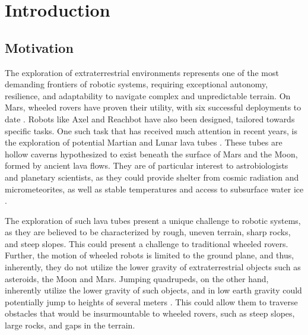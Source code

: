 \section{Introduction}
\label{sec:introduction}

\subsection{Motivation}
\label{sec:motivation}


The exploration of extraterrestrial environments represents one of the most demanding frontiers of robotic systems, requiring exceptional autonomy, resilience, and adaptability to navigate complex and unpredictable terrain. On Mars, wheeled rovers have proven their utility, with six successful deployments to date \cite{mars_rovers_x6}. Robots like Axel \cite{Axel} and Reachbot \cite{ReachBot} have also been designed, tailored towards specific tasks. One such task that has received much attention in recent years, is the exploration of potential Martian and Lunar lava tubes \cite{lavatubes}. These tubes are hollow caverns hypothesized to exist beneath the surface of Mars and the Moon, formed by ancient lava flows. They are of particular interest to astrobiologists and planetary scientists, as they could provide shelter from cosmic radiation and micrometeorites, as well as stable temperatures and access to subsurface water ice \cite{lavatubes}.

The exploration of such lava tubes present a unique challenge to robotic systems, as they are believed to be characterized by rough, uneven terrain, sharp rocks, and steep slopes. This could present a challenge to traditional wheeled rovers. Further, the motion of wheeled robots is limited to the ground plane, and thus, inherently, they do not utilize the lower gravity of extraterrestrial objects such as asteroids, the Moon and Mars. Jumping quadrupeds, on the other hand, inherently utilize the lower gravity of such objects, and in low earth gravity could potentially jump to heights of several meters \cite{OLYMPUS2}. This could allow them to traverse obstacles that would be insurmountable to wheeled rovers, such as steep slopes, large rocks, and gaps in the terrain.

